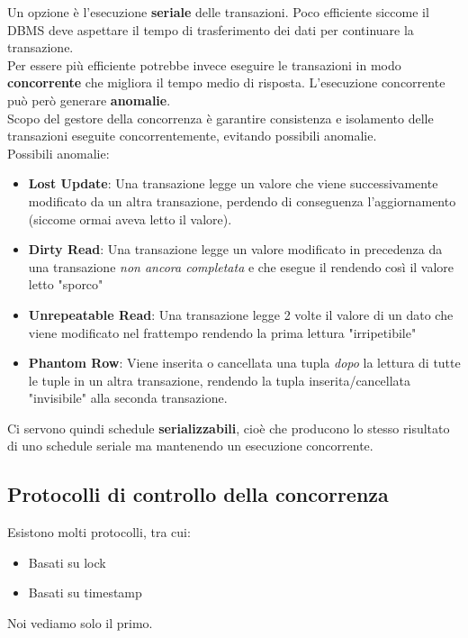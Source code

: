 Un opzione \`e l'esecuzione \textbf{seriale} delle transazioni. Poco efficiente siccome il DBMS deve aspettare il tempo di trasferimento dei dati per continuare la transazione.\\
Per essere più efficiente potrebbe invece eseguire le transazioni in modo \textbf{concorrente} che migliora il tempo medio di risposta. L'esecuzione concorrente può però generare \textbf{anomalie}.\\
Scopo del gestore della concorrenza è garantire consistenza e isolamento delle transazioni eseguite concorrentemente, evitando possibili anomalie.\\
Possibili anomalie:
\begin{itemize}
    \item \textbf{Lost Update}: Una transazione legge un valore che viene successivamente modificato da un altra transazione, perdendo di conseguenza l'aggiornamento (siccome ormai aveva letto il valore).
    
    \item \textbf{Dirty Read}: Una transazione legge un valore modificato in precedenza da una transazione \textit{non ancora completata} e che esegue il  rendendo così il valore letto "sporco"
    
    \item \textbf{Unrepeatable Read}: Una transazione legge 2 volte il valore di un dato che viene modificato nel frattempo rendendo la prima lettura "irripetibile"
    
    \item \textbf{Phantom Row}: Viene inserita o cancellata una tupla \textit{dopo} la lettura di tutte le tuple in un altra transazione, rendendo la tupla inserita/cancellata "invisibile" alla seconda transazione.
\end{itemize}
Ci servono quindi schedule \textbf{serializzabili}, cioè che producono lo stesso risultato di uno schedule seriale ma mantenendo un esecuzione concorrente.

\subsection{Protocolli di controllo della concorrenza}
Esistono molti protocolli, tra cui:
\begin{itemize}
    \item Basati su lock
    \item Basati su timestamp
\end{itemize}
Noi vediamo solo il primo.

